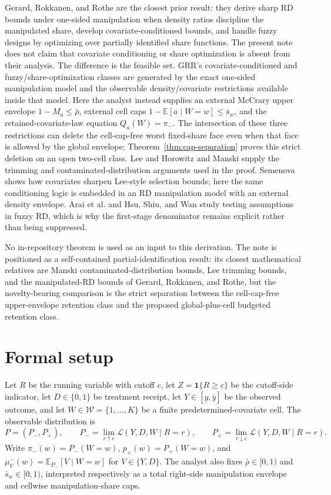 \documentclass[11pt]{article}
\newcommand{\E}{\mathbb{E}}
\newcommand{\one}{\mathbf{1}}
\theoremstyle{definition}
\theoremstyle{plain}
\theoremstyle{remark}
\begin{document}
Gerard, Rokkanen, and Rothe \cite{GerardRokkanenRothe2020} are the closest prior result:
they derive sharp RD bounds under one-sided manipulation when density ratios discipline
the manipulated share, develop covariate-conditioned bounds, and handle fuzzy designs by
optimizing over partially identified share functions.  The present note does not claim
that covariate conditioning or share optimization is absent from their analysis.  The
difference is the feasible set.  GRR's covariate-conditioned and fuzzy/share-optimization
classes are generated by the exact one-sided manipulation model and the observable
density/covariate restrictions available inside that model.  Here the analyst instead
supplies an external McCrary upper envelope \(1-M_a\le\bar\rho\), external cell caps
\(1-\E[a\mid W=w]\le\bar s_w\), and the retained-covariate-law equation
\(Q_a(W)=\pi_-\).  The intersection of these three restrictions can delete the
cell-cap-free worst fixed-share face even when that face is allowed by the global envelope;
Theorem~\ref{thm:cap-separation} proves this strict deletion on an open two-cell class.
Lee \cite{Lee2009} and Horowitz and Manski \cite{HorowitzManski1995} supply the trimming
and contaminated-distribution arguments used in the proof.  Semenova \cite{Semenova2025}
shows how covariates sharpen Lee-style selection bounds; here the same conditioning logic
is embedded in an RD manipulation model with an external density envelope.  Arai et al.
\cite{AraiHsuKitagawaMourifieWan2022} and Hsu, Shiu, and Wan \cite{HsuShiuWan2024} study
testing assumptions in fuzzy RD, which is why the first-stage denominator remains explicit
rather than being suppressed.

No in-repository theorem is used as an input to this derivation.  The note is positioned
as a self-contained partial-identification result: its closest mathematical relatives are
Manski contaminated-distribution bounds, Lee trimming bounds, and the manipulated-RD
bounds of Gerard, Rokkanen, and Rothe, but the novelty-bearing comparison is the strict
separation between the cell-cap-free upper-envelope retention class and the proposed
global-plus-cell budgeted retention class.

\section{Formal setup}
Let \(R\) be the running variable with cutoff \(c\), let \(Z=\one\{R\ge c\}\) be the
cutoff-side indicator, let \(D\in\{0,1\}\) be treatment receipt, let
\(Y\in[\underline y,\overline y]\) be the observed outcome, and let
\(W\in\mathcal W=\{1,\ldots,K\}\) be a finite predetermined-covariate cell.  The observable
distribution is
\[
  P=(P_-,P_+),\qquad
  P_-=\lim_{r\uparrow c}\mathcal L(Y,D,W\mid R=r),\qquad
  P_+=\lim_{r\downarrow c}\mathcal L(Y,D,W\mid R=r).
\]
Write \(\pi_-(w)=P_-(W=w)\), \(p_+(w)=P_+(W=w)\), and
\(\mu^-_V(w)=\E_{P_-}[V\mid W=w]\) for \(V\in\{Y,D\}\).  The analyst also fixes
\(\bar\rho\in[0,1)\) and \(\bar s_w\in[0,1)\), interpreted respectively as a total
right-side manipulation envelope and cellwise manipulation-share caps.
\end{document}
